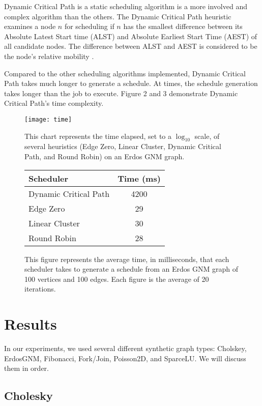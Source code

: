 \documentclass[11pt, oneside]{article}   	%
\begin{document}
Dynamic Critical Path is a static scheduling algorithm is a more involved and complex algorithm than the others. The Dynamic Critical Path heuristic examines a node $n$ for scheduling if $n$ has the smallest difference between its Absolute Latest Start time (ALST) and Absolute Earliest Start Time (AEST) of all candidate nodes. The difference between ALST and AEST is considered to be the node's relative mobility \cite{dcp}\cite{lit-review}.

Compared to the other scheduling algorithms implemented, Dynamic Critical Path takes much longer to generate a schedule. At times, the schedule generation takes longer than the job to execute. Figure 2 and 3 demonstrate Dynamic Critical Path's time complexity.

\begin{figure}[t]
\texttt{[image: time]}
\centering
\caption{This chart represents the time elapsed, set to a $\log_{10}$ scale, of several heuristics (Edge Zero, Linear Cluster, Dynamic Critical Path, and Round Robin) on an Erdos GNM graph.}
\end{figure}

\begin{figure}
\begin{tabular}{| l | c |}
  \hline
  Scheduler & Time (ms) \\ \hline
  Dynamic Critical Path & 4200 \\
  Edge Zero & 29 \\
  Linear Cluster & 30 \\
  Round Robin & 28 \\
  \hline			
\end{tabular}
\centering
\caption{This figure represents the average time, in milliseconds, that each scheduler takes to generate a schedule from an Erdos GNM graph of 100 vertices and 100 edges. Each figure is the average of 20 iterations.}
\end{figure}

\section{Results}

In our experiments, we used several different synthetic graph types: Cholskey, ErdosGNM, Fibonacci, Fork/Join, Poisson2D, and SparceLU. We will discuss them in order.

\subsection{Cholesky}
\end{document}
